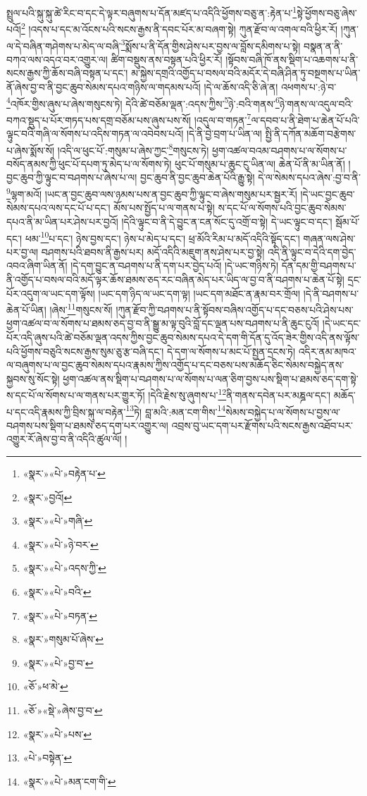 སྤྲུལ་པའི་སྐུ་སྐུ་ཚེ་རིང་བ་དང་དེ་ལྟར་བཞུགས་པ་དོན་མཛད་པ་འདིའི་ཕྱོགས་བཅུ་ན་:རྟེན་པ་\footnote{«སྣར་»«པེ་»བརྟེན་པ་}སྟེ་ཕྱོགས་བཅུ་ཞེས་པའོ།\footnote{«སྣར་»བྱའོ།} །འདས་པ་དང་མ་འོངས་པའི་སངས་རྒྱས་ནི་དབང་པོར་མ་བཞག་སྟེ། ཀུན་རྫོབ་ལ་འགལ་བའི་ཕྱིར་རོ། །ཀུན་ལ་དེ་བཞིན་གཤེགས་པ་མེད་ལ་བཞི་\footnote{«སྣར་»«པེ་»གཞི་}སྨོས་པ་ནི་དོན་གྱིས་ཤེས་པར་བྱས་ལ་བློས་དམིགས་པ་སྟེ། བསྣན་ན་ནི་བཀའ་ལས་འདའ་བར་འགྱུར་ལ། ཚིག་བསྡུས་ནས་བསྟན་པའི་ཕྱིར་རོ། །སྟོབས་བཞི་ཁོ་ནས་སྡིག་པ་འཆགས་པ་ནི་སངས་རྒྱས་ཀྱི་ཆོས་བཞི་བསྟན་པ་དང་། མ་སྐྱེས་དགྲའི་འགྱོད་པ་བསལ་བའི་མདོར་དེ་བཞི་ཤིན་ཏུ་བསྔགས་པ་ཡིན་ནོ་ཞེས་བྱ་བ་ནི་བྱང་ཆུབ་སེམས་དཔའ་གཉིས་ལ་གདམས་པའོ། །དེ་ལ་ཆོས་འདི་ཅི་ཞེ་ན། འཕགས་པ་:ཉེ་བ་\footnote{«སྣར་»«པེ་»ཉེ་བར་}འཁོར་གྱིས་ཞུས་པ་ཞེས་གསུངས་ཏེ། དེའི་ཚེ་བཅོམ་ལྡན་:འདས་ཀྱིས་\footnote{«སྣར་»«པེ་»འདས་ཀྱི་}ཉེ་:བའི་གནས་\footnote{«སྣར་»«པེ་»བའི་}ཉེ་གནས་ལ་འདུལ་བའི་བཀའ་སྡུད་པ་པོར་གཏད་པས་དགྲ་བཅོམ་པས་ཞུས་པས་སོ། །འདུལ་བ་གཏན་\footnote{«སྣར་»«པེ་»བཏན་}ལ་དབབ་པ་ནི་ཐེག་པ་ཆེན་པོ་པའི་ལྟུང་བའི་གཞི་ལ་སོགས་པ་འདིས་གཏན་ལ་འབེབས་པའོ། །དེ་ནི་བྱེ་བྲག་པ་ཡིན་ལ། སྤྱི་ནི་དཀོན་མཆོག་བརྩེགས་པ་ཞེས་སྨོས་སོ། །འདི་ལ་ཕུང་པོ་:གསུམ་པ་ཞེས་ཀྱང་\footnote{«སྣར་»གསུམ་པོ་ཞེས་}གསུངས་ཏེ། ཕྱག་འཚལ་བའམ་བཤགས་པ་ལ་སོགས་པ་བསོད་ནམས་ཀྱི་ཕུང་པོ་དཔག་ཏུ་མེད་པ་ལ་སོགས་ཏེ། ཕུང་པོ་གསུམ་པ་ཆུང་ངུ་ཡིན་ལ། ཆེན་པོ་ནི་མ་ཡིན་ནོ། །བྱང་ཆུབ་ཀྱི་ལྟུང་བ་བཤགས་པ་ཞེས་པ་ལ། བྱང་ཆུབ་ནི་བྱང་ཆུབ་ཆེན་པོའི་རྒྱུ་སྟེ། དེ་ལ་སེམས་དཔའ་ཞེས་:བྱ་བ་ནི་\footnote{«སྣར་»«པེ་»བྱ་བ་}ལྷག་མའོ། །ཡང་ན་བྱང་ཆུབ་ལས་ཉམས་པས་ན་བྱང་ཆུབ་ཀྱི་ལྟུང་བ་ཞེས་གསུམ་པར་སྦྱར་རོ། །དེ་ཡང་བྱང་ཆུབ་སེམས་དཔའ་ལས་དང་པོ་པ་དང་། མོས་པས་སྤྱོད་པ་ལ་གནས་པ་སྟེ། ས་དང་པོ་ལ་སོགས་པའི་བྱང་ཆུབ་སེམས་དཔའ་ནི་མ་ཡིན་པར་ཤེས་པར་བྱའོ། །དེའི་ལྟུང་བ་ནི་དེ་བྱུང་ན་ངན་སོང་དུ་འགྲོ་བ་སྟེ། དེ་ཡང་ལྟུང་བ་དང་། སྦོམ་པོ་དང་། ཕམ་\footnote{«ཅོ་»ཕ་མེ་}པ་དང་། ཉེས་བྱས་དང་། ཉེས་པ་མེད་པ་དང་། ཕྲ་མོའི་རིམ་པ་མདོ་འདིའི་སྟོད་དང་། གཞན་ལས་ཤེས་པར་བྱ་ལ། བཤགས་པའི་ཐབས་ནི་རྒྱས་པར། མདོ་འདིའི་མཇུག་ནས་ཤེས་པར་བྱ་སྟེ། འདི་ནི་ལྟུང་བ་དེའི་དག་བྱེད་འབའ་ཞིག་ཡིན་ནོ། །དེ་དག་བྱུང་ན་བཤགས་པ་ནི་དག་པར་བྱེད་པའོ། །དེ་ཡང་གཉིས་ཏེ། དོན་དམ་གྱི་བཤགས་པ་ནི་འགྱོད་པ་བསལ་བའི་མདོ་ལྟར་ཆོས་ཐམས་ཅད་རང་བཞིན་མེད་པར་ཡིད་ལ་བྱ་བ་ནི་བཤགས་པ་ཆེན་པོ་སྟེ། དྲང་པོར་འདུག་ལ་ཡང་དག་ལྟོས། །ཡང་དག་ཉིད་ལ་ཡང་དག་ལྟ། །ཡང་དག་མཐོང་ན་རྣམ་བར་གྲོལ། །དེ་ནི་བཤགས་པ་ཆེན་པོ་ཡིན། །ཞེས་\footnote{«ཅོ་»«སྡེ་»ཞེས་བྱ་བ་}གསུངས་སོ། །ཀུན་རྫོབ་ཀྱི་བཤགས་པ་ནི་སྟོབས་བཞིས་འགྱོད་པ་དང་བཅས་པའི་ཤེས་པས་ཕྱག་འཚལ་བ་ལ་སོགས་པ་ཐམས་ཅད་བྱ་བ་ནི་སྒྱུ་མ་ལྟ་བུའི་བློ་དང་ལྡན་པས་བཤགས་པ་ནི་ཆུང་ངུའོ། །དེ་ཡང་དང་པོར་འདི་ཞུས་པའི་ཚེ་བཅོམ་ལྡན་འདས་ཀྱིས་བྱང་ཆུབ་སེམས་དཔའ་དེ་དག་གི་དོན་དུ་འོད་ཟེར་གྱིས་འདི་ནས་ལྟོས་པའི་ཕྱོགས་བཅུའི་སངས་རྒྱས་སུམ་ཅུ་རྩ་བཞི་དང་། དེ་དག་ལ་སོགས་པ་མང་པོ་སྤྱན་དྲངས་ཏེ། འདིར་ནམ་མཁའ་ལ་བཞུགས་པ་ལ་བྱང་ཆུབ་སེམས་དཔའ་རྣམས་ཀྱིས་འགྱོད་པ་དང་བཅས་པས་མཆོད་ཅིང་སེམས་བསྐྱེད་ནས་སྐྱབས་སུ་སོང་སྟེ། ཕྱག་འཚལ་ནས་སྡིག་པ་བཤགས་པ་ལ་སོགས་པ་ལན་ཅིག་བྱས་པས་སྡིག་པ་ཐམས་ཅད་དག་སྟེ་ས་དང་པོ་ལ་སོགས་པ་ལ་གནས་པར་གྱུར་ཏོ། །དེའི་རྗེས་སུ་ཞུགས་པ་\footnote{«སྣར་»«པེ་»པས་}ནི་གནས་དབེན་པར་མཎྜལ་དང་། མཆོད་པ་དང་འདི་རྣམས་ཀྱི་བྲིས་སྐུ་ལ་བརྟེན་\footnote{«པེ་»བསྟེན་}ཏེ། བླ་མའི་:མན་ངག་གིས་\footnote{«སྣར་»«པེ་»མན་ངག་གི་}སེམས་བསྐྱེད་པ་ལ་སོགས་པ་བྱས་ལ་བཤགས་པས་སྡིག་པ་ཐམས་ཅད་དག་པར་འགྱུར་ལ། འབྲས་བུ་ཡང་དག་པར་རྫོགས་པའི་སངས་རྒྱས་འཐོབ་པར་འགྱུར་རོ་ཞེས་བྱ་བ་ནི་འདིའི་ཚུལ་ལོ། །
